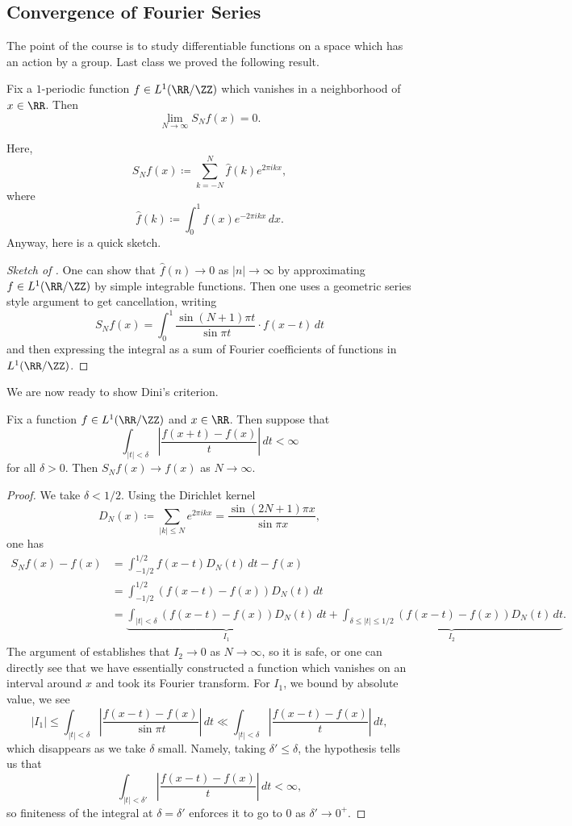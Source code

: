\documentclass[../notes.tex]{subfiles}
\begin{document}
\subsection{Convergence of Fourier Series}
The point of the course is to study differentiable functions on a space which has an action by a group. Last class we proved the following result.
\begin{theorem} \label{thm:riemann-local}
	Fix a $1$-periodic function $f\in L^1(\RR/\ZZ)$ which vanishes in a neighborhood of $x\in\RR$. Then
	\[\lim_{N\to\infty}S_Nf(x)=0.\]
\end{theorem}
Here,
\[S_Nf(x)\coloneqq\sum_{k=-N}^N\hat f(k)e^{2\pi ikx},\]
where
\[\hat f(k)\coloneqq\int_0^1f(x)e^{-2\pi ikx}\,dx.\]
Anyway, here is a quick sketch.
\begin{proof}[Sketch of ]
	One can show that $\hat f(n)\to0$ as $\left|n\right|\to\infty$ by approximating $f\in L^1(\RR/\ZZ)$ by simple integrable functions. Then one uses a geometric series style argument to get cancellation, writing
	\[S_Nf(x)=\int_0^1\frac{\sin(N+1)\pi t}{\sin\pi t}\cdot f(x-t)\,dt\]
	and then expressing the integral as a sum of Fourier coefficients of functions in $L^1(\RR/\ZZ)$.
\end{proof}
We are now ready to show Dini's criterion.
\begin{theorem} \label{thm:dini}
	Fix a function $f\in L^1(\RR/\ZZ)$ and $x\in\RR$. Then suppose that
	\[\int_{\left|t\right|<\delta}\left|\frac{f(x+t)-f(x)}t\right|\,dt<\infty\]
	for all $\delta>0$. Then $S_Nf(x)\to f(x)$ as $N\to\infty$.
\end{theorem}
\begin{proof}
	We take $\delta<1/2$. Using the Dirichlet kernel
	\[D_N(x)\coloneqq\sum_{\left|k\right|\le N}e^{2\pi ikx}=\frac{\sin(2N+1)\pi x}{\sin\pi x},\]
	one has
	\begin{align*}
		S_Nf(x)-f(x) &= \int_{-1/2}^{1/2}f(x-t)D_N(t)\,dt-f(x) \\
		&= \int_{-1/2}^{1/2}(f(x-t)-f(x))D_N(t)\,dt \\
		&= \underbrace{\int_{\left|t\right|<\delta}(f(x-t)-f(x))D_N(t)\,dt}_{I_1}+\underbrace{\int_{\delta\le\left|t\right|\le1/2}(f(x-t)-f(x))D_N(t)\,dt}_{I_2}.
	\end{align*}
	The argument of  establishes that $I_2\to0$ as $N\to\infty$, so it is safe, or one can directly see that we have essentially constructed a function which vanishes on an interval around $x$ and took its Fourier transform. For $I_1$, we bound by absolute value, we see
	\[\left|I_1\right|\le\int_{\left|t\right|<\delta}\left|\frac{f(x-t)-f(x)}{\sin\pi t}\right|\,dt\ll\int_{\left|t\right|<\delta}\left|\frac{f(x-t)-f(x)}{t}\right|\,dt,\]
	which disappears as we take $\delta$ small. Namely, taking $\delta'\le\delta$, the hypothesis tells us that
	\[\int_{\left|t\right|<\delta'}\left|\frac{f(x-t)-f(x)}{t}\right|\,dt<\infty,\]
	so finiteness of the integral at $\delta=\delta'$ enforces it to go to $0$ as $\delta'\to0^+$.
\end{proof}
\end{document}
